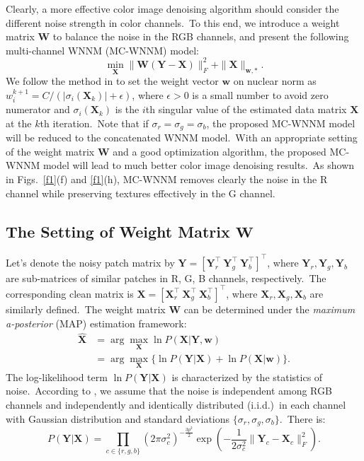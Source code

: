 Clearly, a more effective color image denoising algorithm should consider the different noise strength in color channels.\ To this end, we introduce a weight matrix $\mathbf{W}$ to balance the noise in the RGB channels, and present the following multi-channel WNNM (MC-WNNM) model:
\begin{equation}
\label{e4}
\min_{\mathbf{X}}\|\mathbf{W}(\mathbf{Y}-\mathbf{X})\|_{F}^{2}
+ 
\|\mathbf{X}\|_{\bm{w},*}.
\end{equation}
We follow the method in \cite{wnnmijcv} to set the weight vector $\bm{w}$ on nuclear norm as $w_{i}^{k+1}=C/(|\sigma_{i}(\mathbf{X}_{k})|+\epsilon)$, where $\epsilon>0$ is a small number to avoid zero numerator and $\sigma_{i}(\mathbf{X}_{k})$ is the $i$th singular value of the estimated data matrix $\mathbf{X}$ at the $k$th iteration.\ Note that if $\sigma_{r}=\sigma_{g}=\sigma_{b}$, the proposed MC-WNNM model will be reduced to the concatenated WNNM model.\ With an appropriate setting of the weight matrix $\mathbf{W}$ and a good optimization algorithm, the proposed MC-WNNM model will lead to much better color image denoising results.\ As shown in Figs.\ \ref{f1}(f) and \ref{f1}(h), MC-WNNM removes clearly the noise in the R channel while preserving textures effectively in the G channel. 


\subsection{The Setting of Weight Matrix $\mathbf{W}$}


Let's denote the noisy patch matrix by $\mathbf{Y}=[\mathbf{Y}_{r}^{\top}\ \mathbf{Y}_{g}^{\top}\ \mathbf{Y}_{b}^{\top}]^{\top}$, where $\mathbf{Y}_{r}, \mathbf{Y}_{g}, \mathbf{Y}_{b}$ are sub-matrices of similar patches in R, G, B channels, respectively.\ The corresponding clean matrix is $\mathbf{X}=[\mathbf{X}_{r}^{\top}\ \mathbf{X}_{g}^{\top}\ \mathbf{X}_{b}^{\top}]^{\top}$, where $\mathbf{X}_{r}, \mathbf{X}_{g}, \mathbf{X}_{b}$ are similarly defined.\ The weight matrix $\mathbf{W}$ can be determined under the \emph{maximum a-posterior} (MAP) estimation framework:
\begin{equation}
\label{e5}
\begin{split}
\hat{\mathbf{X}} 
&=
\arg\max_{\mathbf{X}}\ln P(\mathbf{X}|\mathbf{Y},\bm{w})
\\
&
=
\arg\max_{\mathbf{X}}\{\ln P(\mathbf{Y}|\mathbf{X})+\ln P(\mathbf{X}|\bm{w})\}.
\end{split}
\end{equation}
The log-likelihood term $\ln P(\mathbf{Y}|\mathbf{X})$ is characterized by the
statistics of noise.\ According to \cite{Leungtip}, we assume that the noise is independent among RGB channels and independently and identically distributed (i.i.d.)\ in each channel with Gaussian distribution and standard deviations $\{\sigma_{r}, \sigma_{g}, \sigma_{b}\}$.\ There is:
\begin{equation}
\label{e6}
P(\mathbf{Y}|\mathbf{X})
= 
\prod_{c\in\{r, g, b\}}
(2\pi\sigma_{c}^{2})^{-\frac{3p^{2}}{2}}
\exp(-\frac{1}{2\sigma_{c}^{2}}\|\mathbf{Y}_{c}-\mathbf{X}_{c}\|_{F}^{2}).
\end{equation}

